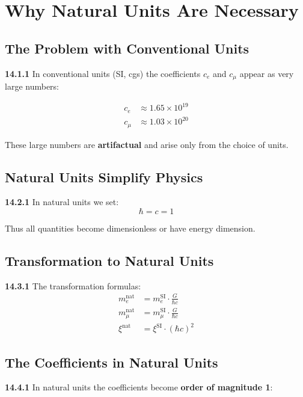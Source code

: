 \documentclass[12pt,a4paper]{article}
\begin{document}

\section{Why Natural Units Are Necessary}

\subsection{The Problem with Conventional Units}

\noindent \textbf{14.1.1} In conventional units (SI, cgs) the coefficients $c_e$ and $c_\mu$ appear as very large numbers:

\begin{align*}
	c_e &\approx 1.65 \times 10^{19} \\
	c_\mu &\approx 1.03 \times 10^{20}
\end{align*}

These large numbers are \textbf{artifactual} and arise only from the choice of units.

\subsection{Natural Units Simplify Physics}

\noindent \textbf{14.2.1} In natural units we set:
\[
\hbar = c = 1
\]

Thus all quantities become dimensionless or have energy dimension.

\subsection{Transformation to Natural Units}

\noindent \textbf{14.3.1} The transformation formulas:
\begin{align*}
	m_e^{\text{nat}} &= m_e^{\text{SI}} \cdot \frac{G}{\hbar c} \\
	m_\mu^{\text{nat}} &= m_\mu^{\text{SI}} \cdot \frac{G}{\hbar c} \\
	\xi^{\text{nat}} &= \xi^{\text{SI}} \cdot (\hbar c)^2
\end{align*}

\subsection{The Coefficients in Natural Units}

\noindent \textbf{14.4.1} In natural units the coefficients become \textbf{order of magnitude 1}:
\end{document}
